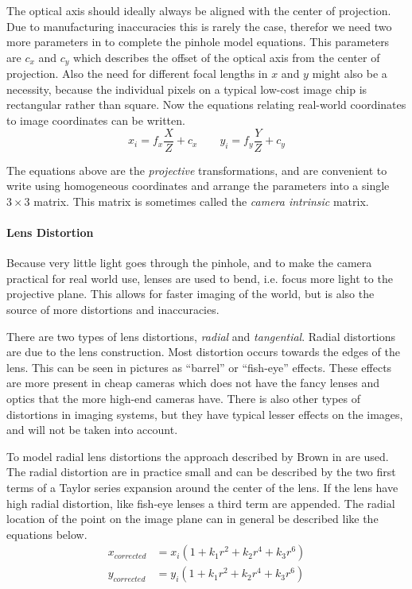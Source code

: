 The optical axis should ideally always be aligned with the center of projection. Due to
manufacturing inaccuracies this is rarely the case, therefor we need two more parameters
in to complete the pinhole model equations. This parameters are $c_x$ and $c_y$ which
describes the offset of the optical axis from the center of projection. Also the need for
different focal lengths in $x$ and $y$ might also be a necessity, because the individual
pixels on a typical low-cost image chip is rectangular rather than square. Now the
equations relating real-world coordinates to image coordinates can be written.
\cite{openCV}
\begin{equation}
    x_i = f_x \frac{X}{Z} + c_x \quad \quad y_i = f_y \frac{Y}{Z} + c_y
\end{equation}

The equations above are the \emph{projective} transformations, and are convenient to
write using homogeneous coordinates and arrange the parameters into a single $3\times 3$
matrix. This matrix is sometimes called the \emph{camera intrinsic} matrix. 

\paragraph{Lens Distortion}
\label{chap2:sec-distortion}
Because very little light goes through the pinhole, and to make the camera practical for
real world use, lenses are used to bend, i.e. focus more light to the projective plane.
This allows for faster imaging of the world, but is also the source of more distortions
and inaccuracies. 

There are two types of lens distortions, \emph{radial} and \emph{tangential}. Radial
distortions are due to the lens construction. Most distortion occurs towards the edges of
the lens. This can be seen in pictures as ``barrel'' or ``fish-eye'' effects. These
effects are more present in cheap cameras which does not have the fancy lenses and optics
that the more high-end cameras have. There is also other types of distortions in imaging
systems, but they have typical lesser effects on the images, and will not be taken into
account. 

To model radial lens distortions the approach described by Brown in
\cite{lens-calibration} are used. The radial distortion are in practice small and can be
described by the two first terms of a Taylor series expansion around the center of the
lens. If the lens have high radial distortion, like fish-eye lenses a third term are
appended. The radial location of the point on the image plane can in general be described
like the equations below. 
\begin{equation}
\begin{aligned}
    x_{corrected} &= x_i ( 1 + k_1 r^2 + k_2 r^4 + k_3 r^6 ) \\
    y_{corrected} &= y_i ( 1 + k_1 r^2 + k_2 r^4 + k_3 r^6 ) 
\end{aligned}
\end{equation}

